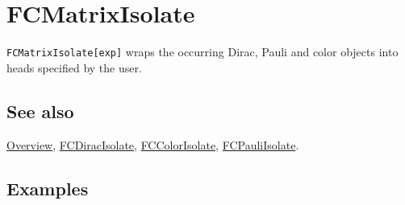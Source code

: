 \documentclass[../FeynCalcManual.tex]{subfiles}
\begin{document}
\hypertarget{fcmatrixisolate}{%
\section{FCMatrixIsolate}\label{fcmatrixisolate}}

\texttt{FCMatrixIsolate[\allowbreak{}exp]} wraps the occurring Dirac,
Pauli and color objects into heads specified by the user.

\subsection{See also}

\hyperlink{toc}{Overview}, \hyperlink{fcdiracisolate}{FCDiracIsolate},
\hyperlink{fccolorisolate}{FCColorIsolate},
\hyperlink{fcpauliisolate}{FCPauliIsolate}.

\subsection{Examples}
\end{document}
